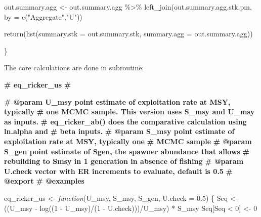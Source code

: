 \documentclass[french,11pt]{book}
\newenvironment{Shaded}{\begin{snugshade}}{\end{snugshade}}
\newcommand{\AttributeTok}[1]{\textcolor[rgb]{0.77,0.63,0.00}{#1}}
\newcommand{\CommentTok}[1]{\textcolor[rgb]{0.56,0.35,0.01}{\textbf{#1}}}
\newcommand{\ControlFlowTok}[1]{\textcolor[rgb]{0.13,0.29,0.53}{\textit{#1}}}
\newcommand{\DecValTok}[1]{\textcolor[rgb]{0.00,0.00,0.81}{#1}}
\newcommand{\FloatTok}[1]{\textcolor[rgb]{0.00,0.00,0.81}{#1}}
\newcommand{\FunctionTok}[1]{\textcolor[rgb]{0.00,0.00,0.00}{#1}}
\newcommand{\NormalTok}[1]{#1}
\newcommand{\OtherTok}[1]{\textcolor[rgb]{0.56,0.35,0.01}{#1}}
\newcommand{\SpecialCharTok}[1]{\textcolor[rgb]{0.00,0.00,0.00}{#1}}
\newcommand{\StringTok}[1]{\textcolor[rgb]{0.31,0.60,0.02}{#1}}
\begin{document}
\begin{Shaded}
\begin{Highlighting}[]
\NormalTok{out.summary.agg }\OtherTok{\textless{}{-}}\NormalTok{ out.summary.agg }\SpecialCharTok{\%\textgreater{}\%} \FunctionTok{left\_join}\NormalTok{(out.summary.agg.stk.pm, }
                       \AttributeTok{by =} \FunctionTok{c}\NormalTok{(}\StringTok{"Aggregate"}\NormalTok{,}\StringTok{"U"}\NormalTok{))}

\FunctionTok{return}\NormalTok{(}\FunctionTok{list}\NormalTok{(}\AttributeTok{summary.stk =}\NormalTok{ out.summary.stk, }\AttributeTok{summary.agg =}\NormalTok{ out.summary.agg))}

\NormalTok{\}}
\end{Highlighting}
\end{Shaded}
The core calculations are done in subroutine:
\begin{Shaded}
\begin{Highlighting}[]

\CommentTok{\#\textquotesingle{} eq\_ricker\_us}
\CommentTok{\#\textquotesingle{}}

\CommentTok{\#\textquotesingle{} @param U\_msy  point estimate of exploitation rate at MSY, typically }
\CommentTok{\#\textquotesingle{}          one MCMC sample. This version uses S\_msy and U\_msy as inputs. }
\CommentTok{\#\textquotesingle{}          eq\_ricker\_ab() does the comparative calculation using ln.alpha and }
\CommentTok{\#\textquotesingle{}          beta inputs. }
\CommentTok{\#\textquotesingle{} @param S\_msy point estimate of exploitation rate at MSY, typically one }
\CommentTok{\#\textquotesingle{}                 MCMC sample}
\CommentTok{\#\textquotesingle{} @param S\_gen point estimate of Sgen, the spawner abundance that allows }
\CommentTok{\#\textquotesingle{}                  rebuilding to Smsy in 1 generation in absence of fishing}
\CommentTok{\#\textquotesingle{} @param U.check vector with ER increments to evaluate, default is 0.5}
\CommentTok{\#\textquotesingle{} @export}
\CommentTok{\#\textquotesingle{} @examples}

\NormalTok{eq\_ricker\_us }\OtherTok{\textless{}{-}} \ControlFlowTok{function}\NormalTok{(U\_msy, S\_msy, S\_gen, }\AttributeTok{U.check =} \FloatTok{0.5}\NormalTok{) \{}
\NormalTok{  Seq }\OtherTok{\textless{}{-}}\NormalTok{ ((U\_msy }\SpecialCharTok{{-}} \FunctionTok{log}\NormalTok{((}\DecValTok{1} \SpecialCharTok{{-}}\NormalTok{ U\_msy)}\SpecialCharTok{/}\NormalTok{(}\DecValTok{1} \SpecialCharTok{{-}}\NormalTok{ U.check)))}\SpecialCharTok{/}\NormalTok{U\_msy) }\SpecialCharTok{*}\NormalTok{ S\_msy}
\NormalTok{  Seq[Seq }\SpecialCharTok{\textless{}} \DecValTok{0}\NormalTok{] }\OtherTok{\textless{}{-}} \DecValTok{0}


\end{Highlighting}
\end{Shaded}
\end{document}
